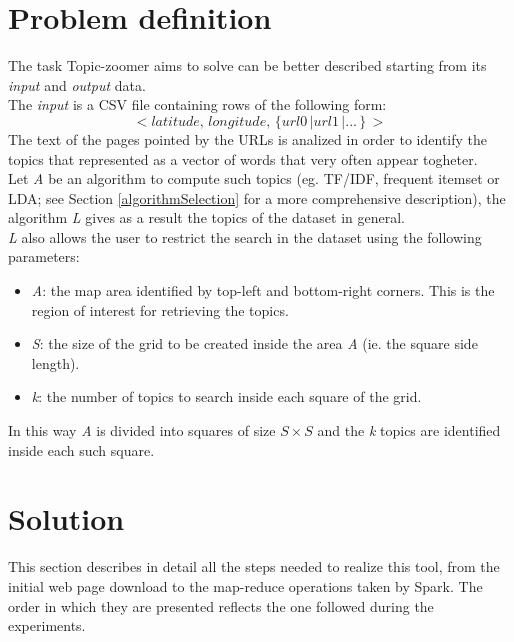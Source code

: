 \documentclass{sig-alternate-05-2015}
\begin{document}
\section{Problem definition}
The task Topic-zoomer aims to solve can be better described starting from its \emph{input} and \emph{output} data.\\
The \emph{input} is a CSV file containing rows of the following form:
\begin{equation}\label{dataset}
    <latitude,\,longitude,\,\{url0\,|url1\,|...\,\}\,>
\end{equation}
The text of the pages pointed by the URLs is analized in order to identify the topics that represented as a vector of words that very often appear togheter.\\
Let \emph{A} be an algorithm to compute such topics (eg. TF/IDF, frequent itemset or LDA; see Section \ref{algorithmSelection} for a more comprehensive description), the algorithm \emph{L} gives as a result the topics of the dataset in general.\\
\emph{L} also allows the user to restrict the search in the dataset using the following parameters:
\begin{itemize}
    \item \emph{A}: the map area identified by top-left and bottom-right corners. This is the region of interest for retrieving the topics. 
    \item \emph{S}: the size of the grid to be created inside the area \emph{A} (ie. the square side length).
    \item \emph{k}: the number of topics to search inside each square of the grid.
\end{itemize}
In this way \emph{A} is divided into squares of size $S \times S$ and the \emph{k} topics are identified inside each such square.


\section{Solution}
This section describes in detail all the steps needed to realize this tool, from the initial web page download to the map-reduce operations taken by Spark. The order in which they are presented reflects the one followed during the experiments.
\end{document}
